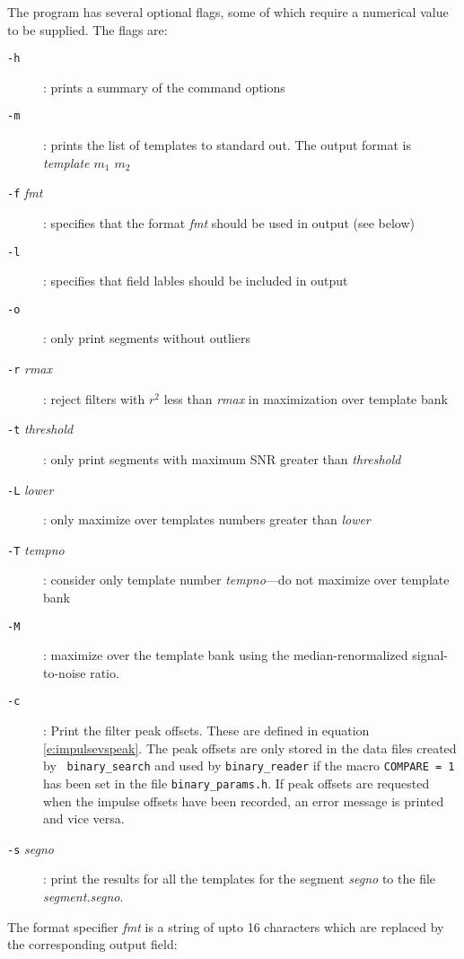 The program has several optional flags,  some of which require a
numerical value to be supplied.   The flags are:
\begin{description}
\item[\texttt{-h}]: prints a summary of the command options
\item[\texttt{-m}]: prints the list of templates to standard out. The
output format is {\textit{template $m_1$ $m_2$}} 
\item[\texttt{-f} \textit{fmt}]: specifies that the format \textit{fmt} should
  be used in output (see below)
\item[\texttt{-l}]: specifies that field lables should be included in output
\item[\texttt{-o}]: only print segments without outliers
\item[\texttt{-r} \textit{rmax}]: reject filters with $r^2$ less than
  \textit{rmax} in maximization over template bank
\item[\texttt{-t} \textit{threshold}]: only print segments with maximum SNR
  greater than \textit{threshold}
\item[\texttt{-L} \textit{lower}]: only maximize over templates numbers greater
  than \textit{lower}
\item[\texttt{-T} \textit{tempno}]: consider only template number
  \textit{tempno}---do not maximize over template bank
\item[\texttt{-M}]: maximize over the template bank using the
  median-renormalized signal-to-noise ratio.
\item[\texttt{-c}]: Print the filter peak offsets. 
		These are defined in equation
		\ref{e:impulsevspeak}. The peak offsets are only
		stored in the data files created by {\tt
		binary\_search} and used by {\tt binary\_reader} 
		if the macro {\tt COMPARE = 1} has been set in
		the file {\tt binary\_params.h}.  If peak offsets are
		requested when the impulse offsets have been recorded,
		an error message is printed and vice versa.
\item[\texttt{-s} \textit{segno}]: print the results for all the templates
for the segment {\em segno} to the file {\em segment.segno}.
\end{description}
The format specifier \textit{fmt} is a string of upto 16 characters which
are replaced by the corresponding output field:
